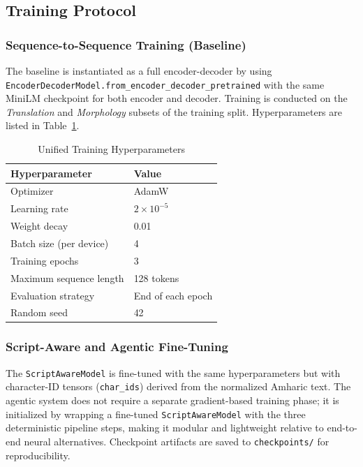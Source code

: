 \subsection{Training Protocol}
\label{sec:training}

\subsubsection{Sequence-to-Sequence Training (Baseline)}

The baseline is instantiated as a full encoder-decoder by using
\texttt{EncoderDecoderModel.from\_encoder\_decoder\_pretrained} with the same MiniLM checkpoint
for both encoder and decoder.  Training is conducted on the \emph{Translation} and
\emph{Morphology} subsets of the training split.  Hyperparameters are listed in
Table~\ref{tab:hyperparams}.

\begin{table}[htbp]
  \centering
  \caption{Unified Training Hyperparameters}
  \label{tab:hyperparams}
  \begin{tabular}{ll}
    \toprule
    \textbf{Hyperparameter}        & \textbf{Value} \\
    \midrule
    Optimizer                      & AdamW \\
    Learning rate                  & $2 \times 10^{-5}$ \\
    Weight decay                   & 0.01 \\
    Batch size (per device)        & 4 \\
    Training epochs                & 3 \\
    Maximum sequence length        & 128 tokens \\
    Evaluation strategy            & End of each epoch \\
    Random seed                    & 42 \\
    \bottomrule
  \end{tabular}
\end{table}

\subsubsection{Script-Aware and Agentic Fine-Tuning}

The \texttt{ScriptAwareModel} is fine-tuned with the same hyperparameters but with
character-ID tensors (\texttt{char\_ids}) derived from the normalized Amharic text.  The
agentic system does not require a separate gradient-based training phase; it is initialized by
wrapping a fine-tuned \texttt{ScriptAwareModel} with the three deterministic pipeline steps,
making it modular and lightweight relative to end-to-end neural alternatives.  Checkpoint
artifacts are saved to \texttt{checkpoints/} for reproducibility.

